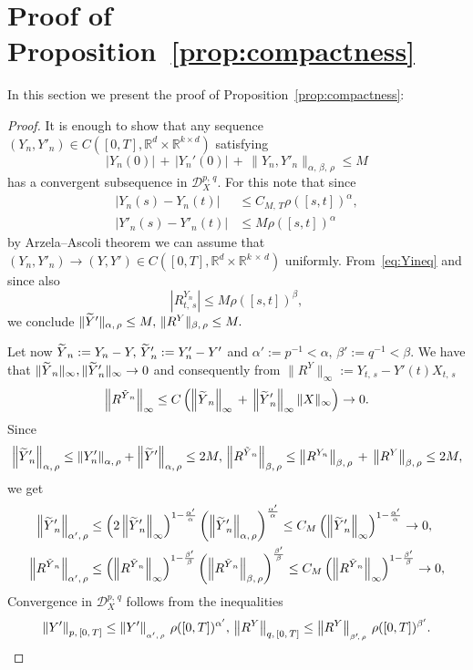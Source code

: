 \documentclass[AHL,Unicode,longabstracts,published]{cedram}
\newcommand{\scrD}{\mathscr{D}}
\newcommand{\Rr}{{\mathbb{R}}}
\let\oldtilde\tilde
\renewcommand*{\tilde}[1]{\mathchoice{\widetilde{#1}}{\widetilde{#1}}{\oldtilde{#1}}{\oldtilde{#1}}}
\begin{document}
\appendix
\section{Proof of Proposition~\ref{prop:compactness}}
In this section we present the proof of Proposition~\ref{prop:compactness}:
\begin{proof}
It is enough to show that any sequence $(Y_n, Y'_n)\in C([0,T], \Rr^d\times \Rr^{k\times d})$ satisfying
\[
\left|Y_n(0)\right|\,+\,\big|Y_n'(0)\big|\,+\,\big\|Y_n, Y'_n\big\|_{\alpha,\,\beta,\,\rho}\leq M
\]
has a convergent subsequence in $\scrD^{p,\,q}_{X}.$ For this note that since
\begin{equation}\label{eq:Yineq}
\begin{split}
\left|Y_n(s)-Y_n(t)\right|&\leq C_{M,\,T}\rho([s,t])^{\alpha},\\
\big|Y'_n(s)-Y'_n(t)\big|&\leq M\rho([s,t])^{\alpha} 
\end{split}
\end{equation}
by Arzela--Ascoli theorem we can assume that $(Y_n, Y'_n)\to (Y, Y')\in C([0,T], \Rr^d\times \Rr^{k\,\times\,d})$ uniformly. From~\eqref{eq:Yineq} and since also
\begin{equation}\label{eq:RYineq}
\left|R^{Y_n}_{t,\,s}\right|\leq M\rho([s,t])^{\beta},
\end{equation}
we conclude $\|\tilde{Y}'\|_{\alpha,\,\rho}\leq M,\, \|R^{{Y}}\|_{\beta,\,\rho}\leq M.$

Let now $\tilde{Y}_n:=Y_n-Y,\, \tilde{Y}'_n:=Y'_n-Y'$ and $\alpha':=p^{-1}<\alpha,\, \beta':=q^{-1}<\beta$. We have that $\|\tilde{Y}_n\|_{\infty}, \|\tilde{Y}_n'\|_{\infty}\to 0$ and consequently from $\|R^{{Y}}\|_{\infty}:=Y_{t,\,s}-Y'(t)X_{t,\,s}$
\[
\left\|R^{\tilde{Y}_n}\right\|_{\infty}\leq C\left(\left\|\tilde{Y}_n\right\|_{\infty}\,+\,\left\|\tilde{Y}'_n\right\|_{\infty}\|X\|_{\infty}\right)\to 0.
\]
Since
\[
\left\|\tilde{Y}_n'\right\|_{\alpha,\,\rho}\leq \left\|Y_n'\right\|_{\alpha,\,\rho}+\left\|\tilde{Y}'\right\|_{\alpha,\,\rho}\leq 2 M,\, \left\|R^{\tilde{Y}_n}\right\|_{\beta,\,\rho}\leq \left\|R^{{Y}_n}\right\|_{\beta,\,\rho}\,+\,\left\|R^{{Y}}\right\|_{\beta,\,\rho}\leq 2 M,
\]
we get
\begin{align*}
\left\|\tilde{Y}_n'\right\|_{\alpha',\,\rho}&\leq\left(2 \left\|\tilde{Y}_n'\right\|_{\infty}\right)^{1-\frac{\alpha'}{\alpha}} \left(\left\|\tilde{Y}_n'\right\|_{\alpha,\,\rho}\right)^{\frac{\alpha'}{\alpha}}\leq C_M \left(\left\|\tilde{Y}_n'\right\|_{\infty}\right)^{1-\frac{\alpha'}{\alpha}}\to 0,
\\
\left\|R^{\tilde{Y}_n}\right\|_{\alpha',\, \rho}&\leq\left(\left\|R^{\tilde{Y}_n}\right\|_{\infty}\right)^{1-\frac{\beta'}{\beta}} \left(\left\|R^{\tilde{Y}_n}\right\|_{\beta,\,\rho}\right)^{\frac{\beta'}{\beta}}\leq C_M\left(\left\|R^{\tilde{Y}_n}\right\|_{\infty}\right)^{1-\frac{\beta'}{\beta}}\to 0,
\end{align*}
Convergence in $\scrD^{p,\,q}_{X}$ follows from the inequalities
\[
\left\|Y'\right\|_{p,\,[0,\,T]}\leq \left\|Y'\right\|_{_{\alpha',\,\rho}}\, \rho([0,T])^{\alpha'},\, \left\|R^Y\right\|_{q,\, [0,\,T]}\leq \left\|R^Y\right\|_{_{\beta'\!,\,\rho}}\, \rho([0,T])^{\beta'}.\qedhere
\]
\end{proof}





\end{document}
